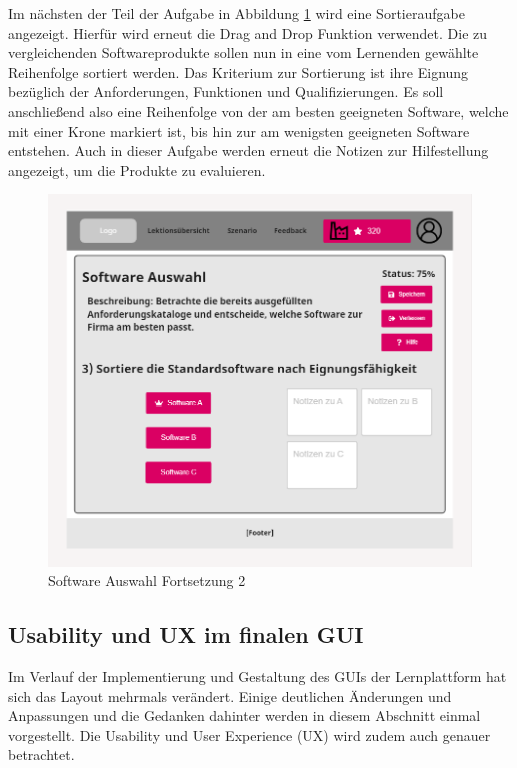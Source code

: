 Im nächsten der Teil der Aufgabe in Abbildung \ref{fig:Software-Auswahl-3} wird eine Sortieraufgabe angezeigt. Hierfür wird erneut die Drag and Drop Funktion verwendet. Die zu vergleichenden Softwareprodukte sollen nun in eine vom Lernenden gewählte Reihenfolge sortiert werden.  Das Kriterium zur Sortierung ist ihre Eignung bezüglich der Anforderungen, Funktionen und Qualifizierungen. 
Es soll anschließend also eine Reihenfolge von der am besten geeigneten Software, welche mit einer Krone markiert ist, bis hin zur am wenigsten geeigneten Software entstehen.
Auch in dieser Aufgabe werden erneut die Notizen zur Hilfestellung angezeigt, um die Produkte zu evaluieren. 

\begin{figure}[H]
    \centering
    \includegraphics[width=1.0\textwidth]{assets/screenshots/mockups/Software-Auswahl-3.png}
    \caption{Software Auswahl Fortsetzung 2}
    \label{fig:Software-Auswahl-3}
\end{figure}

\subsection{Usability und UX im finalen GUI}

Im Verlauf der Implementierung und Gestaltung des GUIs der Lernplattform hat sich das Layout mehrmals verändert. Einige deutlichen Änderungen und Anpassungen und die Gedanken dahinter werden in diesem Abschnitt einmal vorgestellt. Die Usability und User Experience (UX) wird zudem auch genauer betrachtet.


